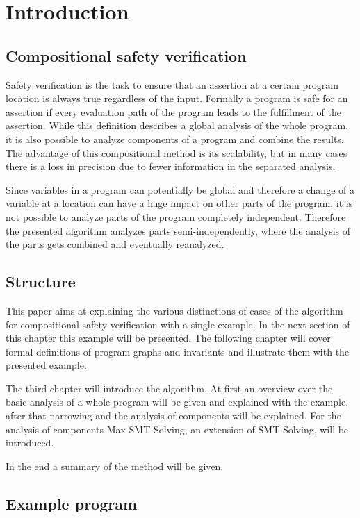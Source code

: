 \section{Introduction}
\label{sec:introduction}

\subsection{Compositional safety verification}

Safety verification is the task to ensure that an assertion at a certain program location is always true regardless of the input.
Formally a program is safe for an assertion if every evaluation path of the program leads to the fulfillment of the assertion.
While this definition describes a global analysis of the whole program, it is also possible to analyze components of a program and combine the results.
The advantage of this compositional method is its scalability, but in many cases there is a loss in precision due to fewer information in the separated analysis.

Since variables in a program can potentially be global and therefore a change of a variable at a location can have a huge impact on other parts of the program, it is not possible to analyze parts of the program completely independent.
Therefore the presented algorithm analyzes parts semi-independently, where the analysis of the parts gets combined and eventually reanalyzed.

\subsection{Structure}

This paper aims at explaining the various distinctions of cases of the algorithm for compositional safety verification with a single example.
In the next section of this chapter this example will be presented.
The following chapter will cover formal definitions of program graphs and invariants and illustrate them with the presented example.

The third chapter will introduce the algorithm. 
At first an overview over the basic analysis of a whole program will be given and explained with the example, after that narrowing and the analysis of components will be explained.
For the analysis of components Max-SMT-Solving, an extension of SMT-Solving, will be introduced.

In the end a summary of the method will be given.

\subsection{Example program}

